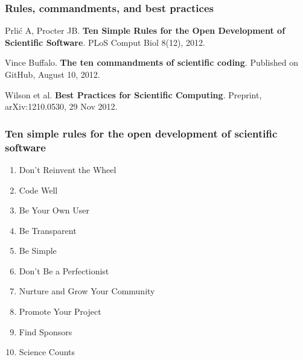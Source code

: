 \documentclass[slidestop]{beamer}
\begin{document}
\begin{frame}
  \frametitle{Rules, commandments, and best practices}
  Prli\'c A, Procter JB. {\bf Ten Simple Rules for the Open Development of
    Scientific Software}. PLoS Comput Biol 8(12), 2012.

  \vspace{0.5cm}

  Vince Buffalo. {\bf The ten commandments of scientific coding}. Published on
  GitHub, August 10, 2012.

  \vspace{0.5cm}

  Wilson et al. {\bf Best Practices for Scientific Computing}. Preprint,
  arXiv:1210.0530, 29 Nov 2012.
\end{frame}

\begin{frame}
  \frametitle{Ten simple rules for the open development of scientific
    software}
  \begin{enumerate}
    \item Don't Reinvent the Wheel
    \item Code Well
    \item Be Your Own User
    \item Be Transparent
    \item Be Simple
    \item Don't Be a Perfectionist
    \item Nurture and Grow Your Community
    \item Promote Your Project
    \item Find Sponsors
    \item Science Counts
  \end{enumerate}
\end{frame}

{
  \frame{}
}
\end{document}
